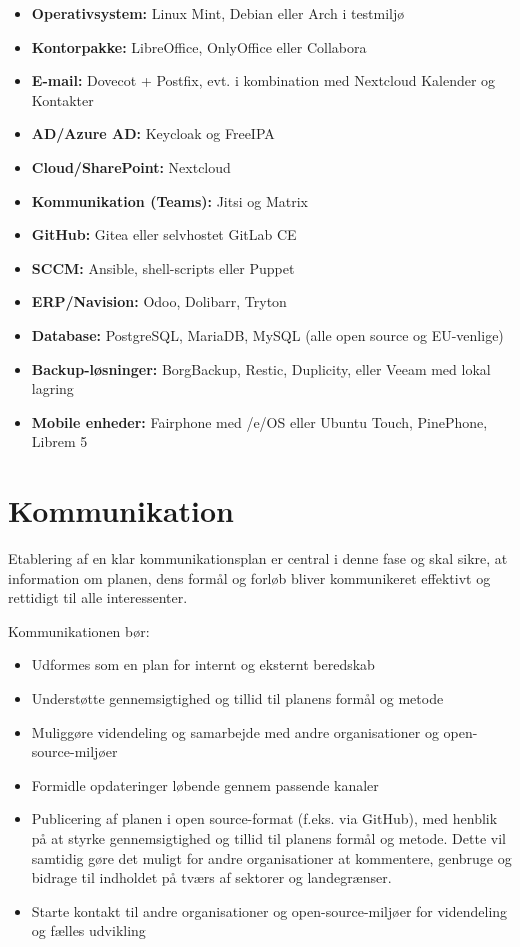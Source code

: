 \documentclass[a4paper,11pt,oneside]{book}
\def\tightlist{}
\begin{document}
\begin{itemize}
\tightlist
\item
  \textbf{Operativsystem:} Linux Mint, Debian eller Arch i testmiljø
\item
  \textbf{Kontorpakke:} LibreOffice, OnlyOffice eller Collabora
\item
  \textbf{E-mail:} Dovecot + Postfix, evt. i kombination med Nextcloud
  Kalender og Kontakter
\item
  \textbf{AD/Azure AD:} Keycloak og FreeIPA
\item
  \textbf{Cloud/SharePoint:} Nextcloud
\item
  \textbf{Kommunikation (Teams):} Jitsi og Matrix
\item
  \textbf{GitHub:} Gitea eller selvhostet GitLab CE
\item
  \textbf{SCCM:} Ansible, shell-scripts eller Puppet
\item
  \textbf{ERP/Navision:} Odoo, Dolibarr, Tryton
\item
  \textbf{Database:} PostgreSQL, MariaDB, MySQL (alle open source og
  EU-venlige)
\item
  \textbf{Backup-løsninger:} BorgBackup, Restic, Duplicity, eller Veeam
  med lokal lagring
\item
  \textbf{Mobile enheder:} Fairphone med /e/OS eller Ubuntu Touch,
  PinePhone, Librem 5
\end{itemize}

\section{Kommunikation}\label{kommunikation}

Etablering af en klar kommunikationsplan er central i denne fase og skal
sikre, at information om planen, dens formål og forløb bliver
kommunikeret effektivt og rettidigt til alle interessenter.

Kommunikationen bør:

\begin{itemize}
\tightlist
\item
  Udformes som en plan for internt og eksternt beredskab
\item
  Understøtte gennemsigtighed og tillid til planens formål og metode
\item
  Muliggøre videndeling og samarbejde med andre organisationer og
  open-source-miljøer
\item
  Formidle opdateringer løbende gennem passende kanaler
\item
  Publicering af planen i open source-format (f.eks. via GitHub), med
  henblik på at styrke gennemsigtighed og tillid til planens formål og
  metode. Dette vil samtidig gøre det muligt for andre organisationer at
  kommentere, genbruge og bidrage til indholdet på tværs af sektorer og
  landegrænser.
\item
  Starte kontakt til andre organisationer og open-source-miljøer for
  videndeling og fælles udvikling
\end{itemize}
\end{document}
